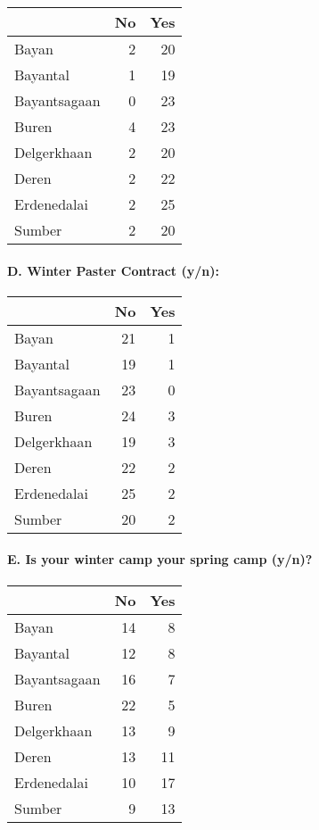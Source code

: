\documentclass[
]{article}
\begin{document}
\begin{longtable}[]{@{}lrr@{}}
\toprule\noalign{}
& No & Yes \\
\midrule\noalign{}
\endhead
\bottomrule\noalign{}
\endlastfoot
Bayan & 2 & 20 \\
Bayantal & 1 & 19 \\
Bayantsagaan & 0 & 23 \\
Buren & 4 & 23 \\
Delgerkhaan & 2 & 20 \\
Deren & 2 & 22 \\
Erdenedalai & 2 & 25 \\
Sumber & 2 & 20 \\
\end{longtable}

\paragraph{D. Winter Paster Contract
(y/n):}\label{d.-winter-paster-contract-yn}

\begin{longtable}[]{@{}lrr@{}}
\toprule\noalign{}
& No & Yes \\
\midrule\noalign{}
\endhead
\bottomrule\noalign{}
\endlastfoot
Bayan & 21 & 1 \\
Bayantal & 19 & 1 \\
Bayantsagaan & 23 & 0 \\
Buren & 24 & 3 \\
Delgerkhaan & 19 & 3 \\
Deren & 22 & 2 \\
Erdenedalai & 25 & 2 \\
Sumber & 20 & 2 \\
\end{longtable}

\paragraph{E. Is your winter camp your spring camp
(y/n)?}\label{e.-is-your-winter-camp-your-spring-camp-yn}

\begin{longtable}[]{@{}lrr@{}}
\toprule\noalign{}
& No & Yes \\
\midrule\noalign{}
\endhead
\bottomrule\noalign{}
\endlastfoot
Bayan & 14 & 8 \\
Bayantal & 12 & 8 \\
Bayantsagaan & 16 & 7 \\
Buren & 22 & 5 \\
Delgerkhaan & 13 & 9 \\
Deren & 13 & 11 \\
Erdenedalai & 10 & 17 \\
Sumber & 9 & 13 \\
\end{longtable}
\end{document}
